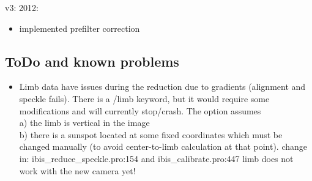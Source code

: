 \documentclass[a4paper,11pt]{article}
\begin{document}
v3: 2012:
\begin{itemize}
\item implemented prefilter correction
\end{itemize}

\subsection{ToDo and known problems}

\begin{itemize}
 \item Limb data have issues during the reduction due to gradients (alignment and speckle fails). There is a /limb keyword, but it would require some modifications and will currently stop/crash. The option assumes\\
      a) the limb is vertical in the image\\
      b) there is a sunspot located at some fixed coordinates which must be changed manually 
         (to avoid center-to-limb calculation at that point). change in: \mbox{ibis\_reduce\_speckle.pro:154} and
            ibis\_calibrate.pro:447
     limb does not work with the new camera yet!


\end{itemize}
\end{document}

